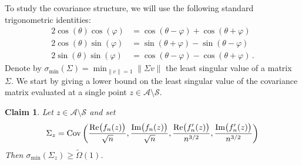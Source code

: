 \documentclass[11pt]{amsart}
\newtheorem{claim}[theorem]{Claim}
\theoremstyle{remark}
\theoremstyle{definition}
\newcommand{\Cov}{\operatorname{Cov}}
\begin{document}
    \noindent
    To study the covariance structure, we will use the following standard trigonometric identities:
    \begin{align}
        \label{eq:trig_identities}
        \nonumber
        2\cos(\theta)\cos(\varphi) &= \cos(\theta-\varphi) + \cos(\theta+\varphi) \\ 2\cos(\theta)\sin(\varphi) &= \sin(\theta+\varphi) - \sin(\theta-\varphi) \\ \nonumber 2\sin(\theta)\sin(\varphi) &= \cos(\theta-\varphi)-\cos(\theta+\varphi) \, .
    \end{align}
    Denote by $\displaystyle \sigma_{\min}(\Sigma) = \min_{\|v\|=1} \| \Sigma v\|$ the least singular value of a matrix $\Sigma$. We start by giving a lower bound on the least singular value of the covariance matrix evaluated at a single point $z\in \mathcal{A} \setminus \mathcal{S}$. 
    \begin{claim}
    \label{claim:lower_bound_on_least_singular_at_a_point}
        Let $z\in \mathcal{A}\setminus \mathcal{S}$ and set 
        \[
        \Sigma_z = \Cov\bigg( \frac{\text{\normalfont Re}\big(f_n(z)\big)}{\sqrt{n}} , \frac{\text{\normalfont Im}\big(f_n(z)\big)}{\sqrt{n}} , \frac{\text{\normalfont Re}\big(f_n^\prime(z)\big)}{n^{3/2}} , \frac{\text{\normalfont Im}\big(f_n^\prime(z)\big)}{n^{3/2}} \bigg)
        \]
        Then $\sigma_{\min}(\Sigma_z) \ge \widetilde\Omega(1)$.
    \end{claim}
\end{document}
